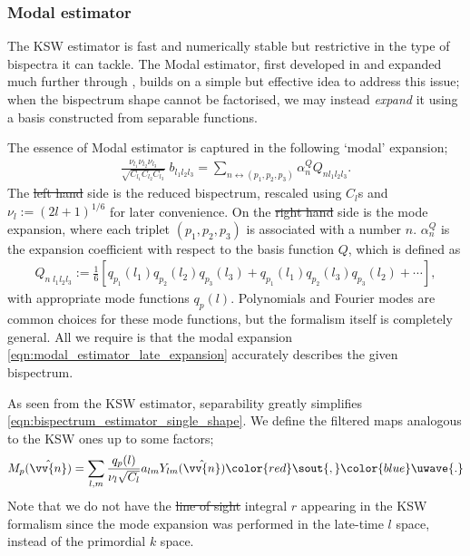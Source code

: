 \documentclass[a4paper,12pt,times,custombib,print,index]{Classes/PhDThesisPSnPDF} %
\providecommand{\DIFadd}[1]{{\protect\color{blue}\uwave{#1}}} %
\providecommand{\DIFdel}[1]{{\protect\color{red}\sout{#1}}}                      %
\providecommand{\DIFaddbegin}{} %
\providecommand{\DIFaddend}{} %
\providecommand{\DIFdelbegin}{} %
\providecommand{\DIFdelend}{} %
\newcommand{\DIFscaledelfig}{0.5}
\newlength{\DIFdelgraphicswidth} %
\newlength{\DIFdelgraphicsheight} %
\newcommand{\DIFaddincludegraphics}[2][]{{\color{blue}\fbox{\DIFOincludegraphics[#1]{#2}}}} %
\newcommand{\DIFdelincludegraphics}[2][]{%
\sbox{\DIFdelgraphicsbox}{\DIFOincludegraphics[#1]{#2}}%
\settoboxwidth{\DIFdelgraphicswidth}{\DIFdelgraphicsbox} %
\settoboxtotalheight{\DIFdelgraphicsheight}{\DIFdelgraphicsbox} %
\scalebox{\DIFscaledelfig}{%
\parbox[b]{\DIFdelgraphicswidth}{\usebox{\DIFdelgraphicsbox}\\[-\baselineskip] \rule{\DIFdelgraphicswidth}{0em}}\llap{\resizebox{\DIFdelgraphicswidth}{\DIFdelgraphicsheight}{%
\setlength{\unitlength}{\DIFdelgraphicswidth}%
\begin{picture}(1,1)%
\thicklines\linethickness{2pt} %
{\color[rgb]{1,0,0}\put(0,0){\framebox(1,1){}}}%
{\color[rgb]{1,0,0}\put(0,0){\line( 1,1){1}}}%
{\color[rgb]{1,0,0}\put(0,1){\line(1,-1){1}}}%
\end{picture}%
}\hspace*{3pt}}} %
} %
\DeclareRobustCommand{\DIFaddbegin}{\DIFOaddbegin \let\includegraphics\DIFaddincludegraphics} %
\DeclareRobustCommand{\DIFaddend}{\DIFOaddend \let\includegraphics\DIFOincludegraphics} %
\DeclareRobustCommand{\DIFdelbegin}{\DIFOdelbegin \let\includegraphics\DIFdelincludegraphics} %
\DeclareRobustCommand{\DIFdelend}{\DIFOaddend \let\includegraphics\DIFOincludegraphics} %
\begin{document}
\subsubsection*{Modal estimator}
The KSW estimator is fast and numerically stable but restrictive in the type of bispectra it can tackle. The Modal estimator, first developed in \cite{Fergusson2010general} and expanded much further through \cite{Fergusson2012,Fergusson2014,Shiraishi2014parityodd,Shiraishi2019cross}, builds on a simple but effective idea to address this issue; when the bispectrum shape cannot be factorised, we may instead \textit{expand} it using a basis constructed from separable functions.

The essence of Modal estimator is captured in the following `modal' expansion;
\begin{align}
	\frac{\nu_{l_1} \nu_{l_2} \nu_{l_3}}{\sqrt{C_{l_1} C_{l_2} C_{l_3}}} \; b_{l_1 l_2 l_3} = \sum_{n \leftrightarrow (p_1,p_2,p_3)} \alpha_n^Q Q_{n l_1 l_2 l_3}. \label{eqn:modal_estimator_late_expansion}
\end{align}
The \DIFdelbegin \DIFdel{left hand }\DIFdelend \DIFaddbegin \DIFadd{left-hand }\DIFaddend side is the reduced bispectrum, rescaled using $C_l$s and $\nu_l := (2l+1)^{1/6}$ for later convenience. On the \DIFdelbegin \DIFdel{right hand }\DIFdelend \DIFaddbegin \DIFadd{right-hand }\DIFaddend side is the mode expansion, where each triplet $(p_1,p_2,p_3)$ is associated with a number $n$. $\alpha_n^Q$ is the expansion coefficient with respect to the basis function $Q$, which is defined as
\begin{align}
	Q_{n \; l_1 l_2 l_3} := \frac{1}{6} \left[ q_{p_1}(l_1) q_{p_2}(l_2) q_{p_3}(l_3) + q_{p_1}(l_1) q_{p_2}(l_3) q_{p_3}(l_2) + \cdots \right],
\end{align}
with appropriate mode functions $q_p(l)$. Polynomials and Fourier modes are common choices for these mode functions, but the formalism itself is completely general. All we require is that the modal expansion \eqref{eqn:modal_estimator_late_expansion} accurately describes the given bispectrum.

As seen from the KSW estimator, separability greatly simplifies \eqref{eqn:bispectrum_estimator_single_shape}. We define the filtered maps analogous to the KSW ones up to some factors;
\begin{align}
	M_p (\hat{\vv{n}}) = \sum_{l,m} \frac{q_p(l)}{\nu_l \sqrt{C_l}} a_{lm} Y_{lm}(\hat{\vv{n}})\DIFdelbegin \DIFdel{, }\DIFdelend \DIFaddbegin \DIFadd{. }\DIFaddend \label{eqn:modal_estimator_filtered_map}
\end{align}
Note that we do not have the \DIFdelbegin \DIFdel{line of sight }\DIFdelend \DIFaddbegin \DIFadd{line-of-sight }\DIFaddend integral $r$ appearing in the KSW formalism since the mode expansion was performed in the late-time $l$ space, instead of the primordial $k$ space.
\end{document}

